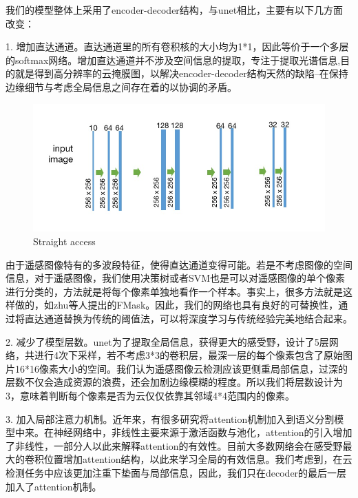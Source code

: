\documentclass[UTF8]{ctexart}
\begin{document}
我们的模型整体上采用了encoder-decoder结构，与unet相比，主要有以下几方面改变：

1. 增加直达通道。直达通道里的所有卷积核的大小均为1*1，因此等价于一个多层的softmax网络。增加直达通道并不涉及空间信息的提取，专注于提取光谱信息,目的就是得到高分辨率的云掩膜图，以解决encoder-decoder结构天然的缺陷--在保持边缘细节与考虑全局信息之间存在着的以协调的矛盾。

\begin{figure}[H]
    \centering
    \includegraphics[scale=0.5]{../pic/straight.jpg}
    \caption[]{Straight access}
    \label{pic:straight}
\end{figure}

由于遥感图像特有的多波段特征，使得直达通道变得可能。若是不考虑图像的空间信息，对于遥感图像，我们使用决策树或者SVM也是可以对遥感图像的单个像素进行分类的，方法就是将每个像素单独地看作一个样本。事实上，很多方法就是这样做的，如zhu等人提出的FMask\cite{zhu2012object}。因此，我们的网络也具有良好的可替换性，通过将直达通道替换为传统的阈值法，可以将深度学习与传统经验完美地结合起来。

2. 减少了模型层数。unet为了提取全局信息，获得更大的感受野，设计了5层网络，共进行4次下采样，若不考虑3*3的卷积层，最深一层的每个像素包含了原始图片16*16像素大小的空间。我们认为遥感图像云检测应该更侧重局部信息，过深的层数不仅会造成资源的浪费，还会加剧边缘模糊的程度。所以我们将层数设计为3，意味着判断每个像素是否为云仅仅依靠其邻域4*4范围内的像素。

3. 加入局部注意力机制。近年来，有很多研究将attention机制加入到语义分割模型中来。在神经网络中，非线性主要来源于激活函数与池化，attention的引入增加了非线性，一部分人以此来解释attention的有效性。目前大多数网络会在感受野最大的卷积位置增加attention结构，以此来学习全局的有效信息。我们考虑到，在云检测任务中应该更加注重下垫面与局部信息，因此，我们只在decoder的最后一层加入了attention机制。
\end{document}
